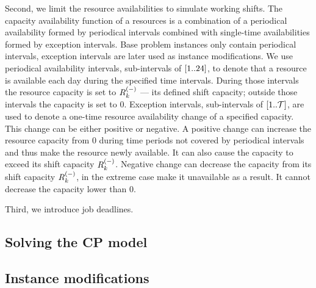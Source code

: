 Second, we limit the resource availabilities to simulate working shifts.
The capacity availability function of a resources is a combination of a periodical availability formed by periodical intervals
combined with single-time availabilities formed by exception intervals.
Base problem instances only contain periodical intervals,
exception intervals are later used as instance modifications.
We use periodical availability intervals, sub-intervals of $[{1}..{24}]$,
to denote that a resource is available each day during the specified time intervals.
During those intervals the resource capacity is set to $\shiftcapacity{k}$ --- its defined shift capacity;
outside those intervals the capacity is set to $0$.
Exception intervals, sub-intervals of $[{1}..{\mathcal{T}}]$, are used
to denote a one-time resource availability change of a specified capacity.
This change can be either positive or negative.
A positive change can increase the resource capacity from $0$ during time periods not covered by periodical intervals
and thus make the resource newly available.
It can also cause the capacity to exceed its shift capacity $\shiftcapacity{k}$.
Negative change can decrease the capacity from its shift capacity $\shiftcapacity{k}$,
in the extreme case make it unavailable as a result.
It cannot decrease the capacity lower than $0$.

Third, we introduce job deadlines.





\subsection*{Solving the CP model} \label{subsec:numerical-experiments/setup/solving-cp-model}



\subsection*{Instance modifications} \label{subsec:numerical-experiments/setup/instance-modifications}



